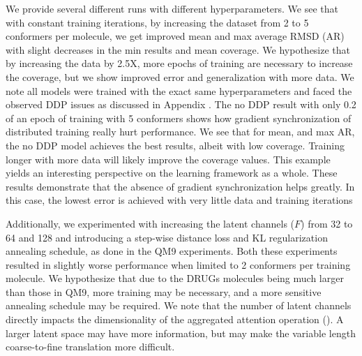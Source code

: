 We provide several different \model runs with different hyperparameters.
We see that with constant training iterations, by increasing the dataset from 2 to 5 conformers per molecule, we get improved mean and max average RMSD (AR) with slight decreases in the min results and mean coverage. 
We hypothesize that by increasing the data by 2.5X, more epochs of training are necessary to increase the coverage, but we show improved error and generalization with more data. 
We note all \model models were trained with the exact same hyperparameters and faced the observed DDP issues as discussed in Appendix . 
The no DDP result with only 0.2 of an epoch of training with 5 conformers shows how gradient synchronization of distributed training really hurt performance. We see that for mean, and max AR, the no DDP model achieves the best results, albeit with low coverage. 
Training longer with more data will likely improve the coverage values. 
This example yields an interesting perspective on the \model learning framework as a whole. 
These results demonstrate that the absence of gradient synchronization helps greatly. In this case, the lowest error is achieved with very little data and training iterations


Additionally, we experimented with increasing the latent channels ($F$) from 32 to 64 and 128 and introducing a step-wise distance loss and KL regularization annealing schedule, as done in the QM9 experiments. Both these experiments resulted in slightly worse performance when limited to 2 conformers per training molecule. We hypothesize that due to the DRUGs molecules being much larger than those in QM9, more training may be necessary, and a more sensitive annealing schedule may be required.
We note that the number of latent channels directly impacts the dimensionality of the aggregated attention operation (). A larger latent space may have more information, but may make the variable length coarse-to-fine translation more difficult.

